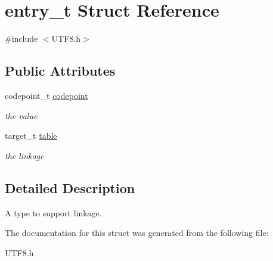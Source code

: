\hypertarget{structentry__t}{}\section{entry\+\_\+t Struct Reference}
\label{structentry__t}


{\ttfamily \#include $<$U\+T\+F8.\+h$>$}

\subsection*{Public Attributes}
\begin{DoxyCompactItemize}
\item 
\hypertarget{structentry__t_a1e82af966dbc9caa8129a7b4320417bc}{}codepoint\+\_\+t \hyperlink{structentry__t_a1e82af966dbc9caa8129a7b4320417bc}{codepoint}\label{structentry__t_a1e82af966dbc9caa8129a7b4320417bc}

\begin{DoxyCompactList}\small\item\em the value \end{DoxyCompactList}\item 
\hypertarget{structentry__t_aee9f08e356b624555bb6101ea4633f3a}{}target\+\_\+t \hyperlink{structentry__t_aee9f08e356b624555bb6101ea4633f3a}{table}\label{structentry__t_aee9f08e356b624555bb6101ea4633f3a}

\begin{DoxyCompactList}\small\item\em the linkage \end{DoxyCompactList}\end{DoxyCompactItemize}


\subsection{Detailed Description}
A type to support linkage. 

The documentation for this struct was generated from the following file\+:\begin{DoxyCompactItemize}
\item 
U\+T\+F8.\+h\end{DoxyCompactItemize}

